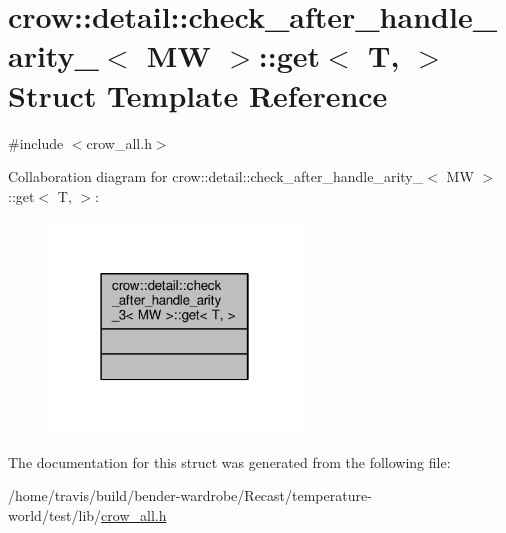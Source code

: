 \hypertarget{structcrow_1_1detail_1_1check__after__handle__arity__3_1_1get}{\section{crow\-:\-:detail\-:\-:check\-\_\-after\-\_\-handle\-\_\-arity\-\_$<$ M\-W $>$\-:\-:get$<$ T, $>$ Struct Template Reference}
\label{structcrow_1_1detail_1_1check__after__handle__arity__3_1_1get}
}


{\ttfamily \#include $<$crow\-\_\-all.\-h$>$}



Collaboration diagram for crow\-:\-:detail\-:\-:check\-\_\-after\-\_\-handle\-\_\-arity\-\_$<$ M\-W $>$\-:\-:get$<$ T, $>$\-:
\nopagebreak
\begin{figure}[H]
\begin{center}
\leavevmode
\includegraphics[width=190pt]{structcrow_1_1detail_1_1check__after__handle__arity__3_1_1get__coll__graph}
\end{center}
\end{figure}


The documentation for this struct was generated from the following file\-:\begin{DoxyCompactItemize}
\item 
/home/travis/build/bender-\/wardrobe/\-Recast/temperature-\/world/test/lib/\hyperlink{crow__all_8h}{crow\-\_\-all.\-h}\end{DoxyCompactItemize}
